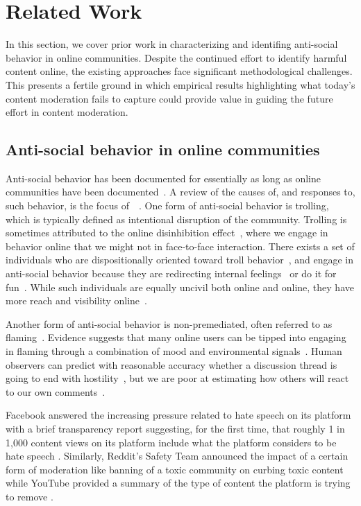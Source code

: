 \section{Related Work}
In this section, we cover prior work in characterizing and identifing anti-social behavior in online communities. Despite the continued effort to identify harmful content online, the existing approaches face significant methodological challenges. This presents a fertile ground in which empirical results highlighting what today's content moderation fails to capture could provide value in guiding the future effort in content moderation.

\subsection{Anti-social behavior in online communities}
Anti-social behavior has been documented for essentially as long as online communities have been documented~\cite{Dibbell1993rape}. A review of the causes of, and responses to, such behavior, is the focus of~\citeauthor{kiesler2012regulating}~\cite{kiesler2012regulating}. One form of anti-social behavior is trolling, which is typically defined as intentional disruption of the community. Trolling is sometimes attributed to the online disinhibition effect~\cite{suler2004online}, where we engage in behavior online that we might not in face-to-face interaction. There exists a set of individuals who are dispositionally oriented toward troll behavior~\cite{buckels2014trolls}, and engage in anti-social behavior because they are redirecting internal feelings~\cite{varjas2010high} or do it for fun~\cite{shachaf2010beyond}. While such individuals are equally uncivil both online and online, they have more reach and visibility online~\cite{bor_petersen_2021}.

Another form of anti-social behavior is non-premediated, often referred to as flaming~\cite{83_Kayany,Kiesler1984social}. Evidence suggests that many online users can be tipped into engaging in flaming through a combination of mood and environmental signals~\cite{cheng2017anyone}. Human observers can predict with reasonable accuracy whether a discussion thread is going to end with hostility~\cite{zhang2018conversations}, but we are poor at estimating how others will react to our own comments~\cite{chang2020don}.

Facebook answered the increasing pressure related to hate speech on its platform with a brief transparency report suggesting, for the first time, that roughly 1 in 1,000 content views on its platform include what the platform considers to be hate speech \cite{58_Culliford}. Similarly, Reddit's Safety Team announced the impact of a certain form of moderation like banning of a toxic community on curbing toxic content \cite{78_Vincent} while YouTube provided a summary of the type of content the platform is trying to remove \cite{77_YoutubeTeam}.

